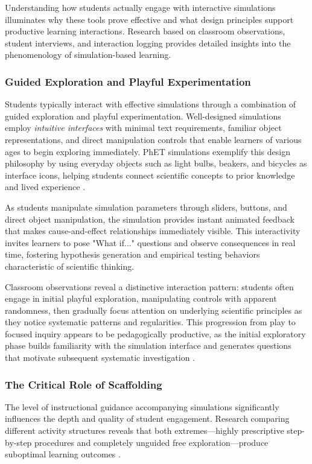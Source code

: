 Understanding how students actually engage with interactive simulations illuminates why these tools prove effective and what design principles support productive learning interactions. Research based on classroom observations, student interviews, and interaction logging provides detailed insights into the phenomenology of simulation-based learning.

\subsubsection{Guided Exploration and Playful Experimentation}

Students typically interact with effective simulations through a combination of guided exploration and playful experimentation. Well-designed simulations employ \textit{intuitive interfaces} with minimal text requirements, familiar object representations, and direct manipulation controls that enable learners of various ages to begin exploring immediately. PhET simulations exemplify this design philosophy by using everyday objects such as light bulbs, beakers, and bicycles as interface icons, helping students connect scientific concepts to prior knowledge and lived experience \cite{phet2023}.

As students manipulate simulation parameters through sliders, buttons, and direct object manipulation, the simulation provides instant animated feedback that makes cause-and-effect relationships immediately visible. This interactivity invites learners to pose "What if..." questions and observe consequences in real time, fostering hypothesis generation and empirical testing behaviors characteristic of scientific thinking.

Classroom observations reveal a distinctive interaction pattern: students often engage in initial playful exploration, manipulating controls with apparent randomness, then gradually focus attention on underlying scientific principles as they notice systematic patterns and regularities. This progression from play to focused inquiry appears to be pedagogically productive, as the initial exploratory phase builds familiarity with the simulation interface and generates questions that motivate subsequent systematic investigation \cite{phet2023}.

\subsubsection{The Critical Role of Scaffolding}

The level of instructional guidance accompanying simulations significantly influences the depth and quality of student engagement. Research comparing different activity structures reveals that both extremes---highly prescriptive step-by-step procedures and completely unguided free exploration---produce suboptimal learning outcomes \cite{phet2023}.

